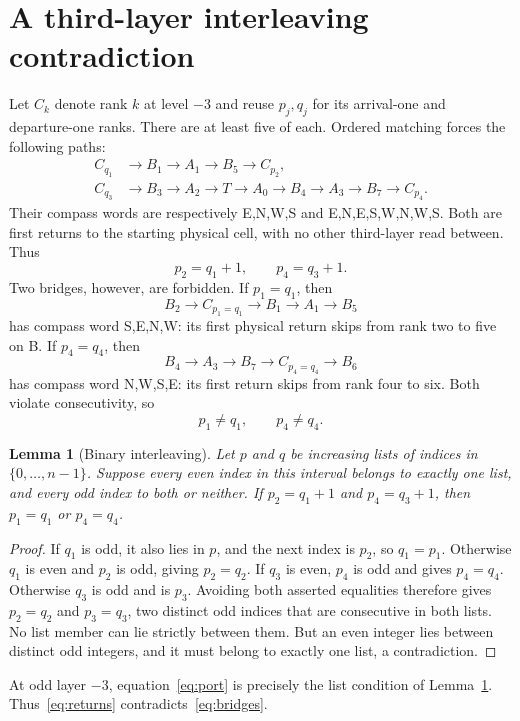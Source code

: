 \documentclass[11pt]{article}
\newtheorem{lemma}[theorem]{Lemma}
\begin{document}
\section{A third-layer interleaving contradiction}
Let $C_k$ denote rank $k$ at level $-3$ and reuse $p_j,q_j$ for its arrival-one
and departure-one ranks. There are at least five of each. Ordered matching
forces the following paths:
\begin{align*}
 C_{q_1}&\to B_1\to A_1\to B_5\to C_{p_2},\\
 C_{q_3}&\to B_3\to A_2\to T\to A_0\to B_4\to A_3\to B_7\to C_{p_4}.
\end{align*}
Their compass words are respectively E,N,W,S and E,N,E,S,W,N,W,S. Both are
first returns to the starting physical cell, with no other third-layer read
between. Thus
\begin{equation}\label{eq:returns}
 p_2=q_1+1,\qquad p_4=q_3+1.
\end{equation}
Two bridges, however, are forbidden. If $p_1=q_1$, then
\[
 B_2\to C_{p_1=q_1}\to B_1\to A_1\to B_5
\]
has compass word S,E,N,W: its first physical return skips from rank two to
five on B. If $p_4=q_4$, then
\[
 B_4\to A_3\to B_7\to C_{p_4=q_4}\to B_6
\]
has compass word N,W,S,E: its first return skips from rank four to six.
Both violate consecutivity, so
\begin{equation}\label{eq:bridges}
 p_1\ne q_1,\qquad p_4\ne q_4.
\end{equation}

\begin{lemma}[Binary interleaving]\label{lem:binary}
Let $p$ and $q$ be increasing lists of indices in $\{0,\ldots,n-1\}$.
Suppose every even index in this interval belongs to exactly one list, and
every odd index to both or neither. If $p_2=q_1+1$ and $p_4=q_3+1$,
then $p_1=q_1$ or $p_4=q_4$.
\end{lemma}
\begin{proof}
If $q_1$ is odd, it also lies in $p$, and the next index is $p_2$, so
$q_1=p_1$. Otherwise $q_1$ is even and $p_2$ is odd, giving $p_2=q_2$.
If $q_3$ is even, $p_4$ is odd and gives $p_4=q_4$. Otherwise $q_3$ is odd
and is $p_3$. Avoiding both asserted equalities therefore gives
$p_2=q_2$ and $p_3=q_3$, two distinct odd indices that are consecutive in
both lists. No list member can lie strictly between them. But an even
integer lies between distinct odd integers, and it must belong to exactly
one list, a contradiction.
\end{proof}
At odd layer $-3$, equation~\eqref{eq:port} is precisely the list condition
of Lemma~\ref{lem:binary}. Thus~\eqref{eq:returns} contradicts~\eqref{eq:bridges}.
\end{document}
